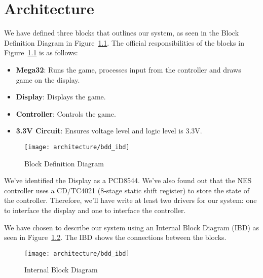 \chapter{Architecture}

We have defined three blocks that outlines our system, as seen in the Block Definition Diagram in Figure~\ref{fig:bdd}. The official responsibilities of the blocks in Figure~\ref{fig:bdd} is as follows:

\begin{itemize}
	\item \textbf{Mega32}: Runs the game, processes input from the controller and draws game on the display.
	\item \textbf{Display}: Displays the game.
	\item \textbf{Controller}: Controls the game.
	\item \textbf{3.3V Circuit}: Ensures voltage level and logic level is 3.3V.
\end{itemize}

\begin{figure}
\centering
\texttt{[image: architecture/bdd\_ibd]}
\caption{Block Definition Diagram}
\label{fig:bdd}
\end{figure}

We've identified the Display as a PCD8544. We've also found out that the NES controller uses a CD/TC4021 (8-stage static shift register) to store the state of the controller. Therefore, we'll have write at least two drivers for our system: one to interface the display and one to interface the controller.

We have chosen to describe our system using an Internal Block Diagram (IBD) as seen in Figure~\ref{fig:ibd}. The IBD shows the connections between the blocks.

\begin{figure}
\centering
\texttt{[image: architecture/bdd\_ibd]}
\caption{Internal Block Diagram}
\label{fig:ibd}
\end{figure}



